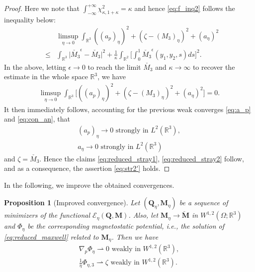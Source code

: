 \documentclass{article}
\newtheorem{proposition}[theorem]{Proposition}
\def\Qvec{\mathbf{Q}}
\def \Mvec{\mathbf{M}}
\begin{document}
\begin{proof}
Here we note that $\int_{-\infty}^{+\infty}\chi^2_{\kappa, 1+\kappa}=\kappa$ and hence \eqref{eq:f_inq2} follows the inequality below:
\begin{eqnarray}
& &\limsup_{\eta\rightarrow 0}\int_{\mathbb R^3}\left(\left(a_p\right)_{\eta}\right)^2+\left(\zeta-\left(M_3\right)_{\eta}\right)^2 + \left(a_{\eta}\right)^2\nonumber\\
&\le&\int_{\mathbb R^3}\bigg|{\check{M_3}}^{\epsilon}-\check{M_3}\bigg|^2+\frac{1}{\kappa}\int_{\mathbb R^2}\bigg[\int_{0}^{1}{\check{M_3}}^{\epsilon}\left(y_1, y_2, s\right)ds\bigg]^2.
\end{eqnarray}
In the above, letting $\epsilon\rightarrow 0$ to reach the limit $\check{M_3}$ and $\kappa\rightarrow\infty$ to recover the estimate in the whole space $\mathbb R^3$, we have
\begin{eqnarray}
\limsup_{\eta\rightarrow 0}\int_{\mathbb R^3}\bigg[\left(\left(a_p\right)_{\eta}\right)^2+\left(\zeta-\left(M_3\right)_{\eta}\right)^2 + \left(a_{\eta}\right)^2\bigg]=0.
\end{eqnarray}
It then immediately follows, accounting for the previous weak converges \eqref{eq:a_p} and \eqref{eq:con_an}, that
\begin{eqnarray}
\left(a_p\right)_{\eta}\rightarrow 0 \mbox{ strongly in } L^2\left(\mathbb R^3\right),\\
a_\eta\rightarrow 0 \mbox{ strongly in } L^2\left(\mathbb R^3\right)
\end{eqnarray}
and $\zeta=\check{M_3}$. Hence the claims \eqref{eq:reduced_stray1}, \eqref{eq:reduced_stray2} follow, and as a consequence, the assertion \eqref{eq:str2'} holds.
\end{proof}
In the following, we improve the obtained convergences.
\begin{proposition}[Improved convergence]\label{improved_convergence}
Let $\left(\Qvec_{\eta}, \Mvec_{\eta}\right)$ be a sequence of minimizers of the functional $\mathcal{E}_{\eta}\left(\Qvec, \Mvec\right)$. Also, let $\Mvec_{\eta}\rightarrow\check{\Mvec}$ in $W^{1,2}\left(\Omega; \mathbb R^3\right)$ and $\Phi_{\eta}$ be the corresponding magnetostatic potential, i.e., the solution of \eqref{eq:reduced_maxwell} related to $\Mvec_{\eta}$. Then we have 
\begin{eqnarray}
\nabla_p\Phi_{\eta}\rightharpoonup 0 \mbox{ weakly in } W^{1,2}\left(\mathbb R^3\right),\label{eq:improved_con1}\\
\frac{1}{\eta}\Phi_{\eta,3}\rightharpoonup \zeta \mbox{ weakly in } W^{1,2}\left(\mathbb R^3\right).\label{eq:improved_con2}
\end{eqnarray}
\end{proposition}
\end{document}
